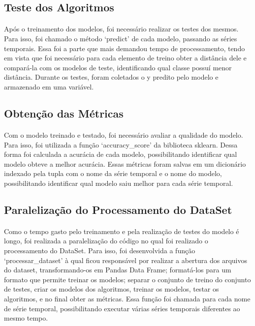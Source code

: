 \documentclass[12pt]{article}
\begin{document}
\subsection{Teste dos Algoritmos}

\paragraph{}Após o treinamento dos modelos, foi necessário realizar os testes dos mesmos. Para isso, foi chamado o método ‘predict’ de cada modelo, passando as séries temporais. Essa foi a parte que mais demandou tempo de processamento, tendo em vista que foi necessário para cada elemento de treino obter a distância dele e compará-la com os modelos de teste, identificando qual classe possuí menor distância. Durante os testes, foram coletados o y predito pelo modelo e armazenado em uma variável.

\subsection{Obtenção das Métricas}

\paragraph{}Com o modelo treinado e testado, foi necessário avaliar a qualidade do modelo. Para isso, foi utilizada a função ‘accuracy\_score’ da biblioteca sklearn. Dessa forma foi calculada a acurácia de cada modelo, possibilitando identificar qual modelo obteve a melhor acurácia. Essas métricas foram salvas em um dicionário indexado pela tupla com o nome da série temporal e o nome do modelo, possibilitando identificar qual modelo saiu melhor para cada série temporal.

\subsection{Paralelização do Processamento do DataSet}

\paragraph{}Como o tempo gasto pelo treinamento e pela realização de testes do modelo é longo, foi realizada a paralelização do código no qual foi realizado o processamento do DataSet. Para isso, foi desenvolvida a função ‘processar\_dataset’ à qual ficou responsável por realizar a abertura dos arquivos do dataset, transformando-os em Pandas Data Frame; formatá-los para um formato que permite treinar os modelos; separar o conjunto de treino do conjunto de testes, criar os modelos dos algoritmos, treinar os modelos, testar os algoritmos, e no final obter as métricas. Essa função foi chamada para cada nome de série temporal, possibilitando executar várias séries temporais diferentes ao mesmo tempo.
\end{document}
